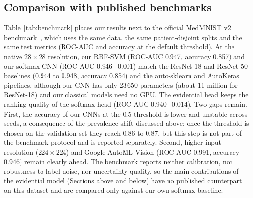 \documentclass[11pt,a4paper]{article}
\begin{document}
\subsection{Comparison with published benchmarks}
Table~\ref{tab:benchmark} places our results next to the official MedMNIST v2 benchmark~\cite{yang2023medmnist}, which
uses the same data, the same patient-disjoint splits and the same test metrics (ROC-AUC and accuracy at the default
threshold). At the native $28\times28$ resolution, our RBF-SVM (ROC-AUC 0.947, accuracy 0.857) and our softmax CNN
(ROC-AUC 0.946$\pm$0.001) match the ResNet-18 and ResNet-50 baselines (0.944 to 0.948, accuracy 0.854) and the
auto-sklearn and AutoKeras pipelines, although our CNN has only 23\,650 parameters (about 11 million for ResNet-18) and our classical models need no GPU.
The evidential head keeps the ranking quality of the softmax head (ROC-AUC 0.940$\pm$0.014). Two gaps remain. First,
the accuracy of our CNNs at the 0.5 threshold is lower and unstable across seeds, a consequence of the prevalence shift
discussed above; once the threshold is chosen on the validation set they reach 0.86 to 0.87, but this step is not part of
the benchmark protocol and is reported separately. Second, higher input resolution ($224\times224$) and
Google AutoML Vision (ROC-AUC 0.991, accuracy 0.946) remain clearly ahead. The benchmark reports neither calibration,
nor robustness to label noise, nor uncertainty quality, so the main contributions of the evidential model
(Sections above and below) have no published counterpart on this dataset and are compared only against our own softmax
baseline.


\end{document}
